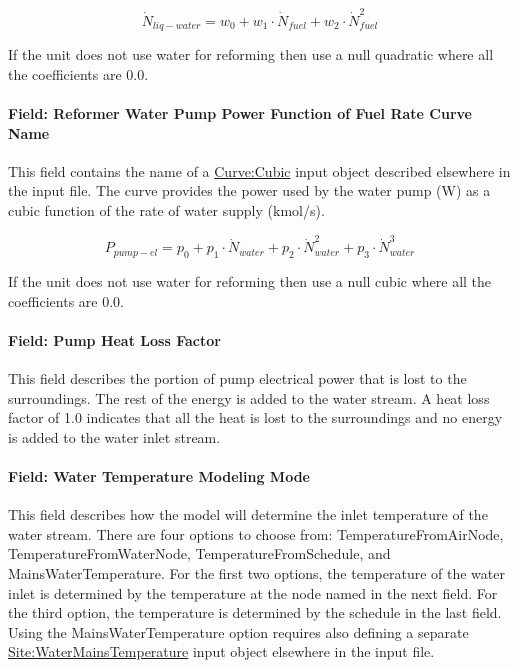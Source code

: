 \begin{equation}
{\dot N_{liq - water}} = {w_0} + {w_1} \cdot {\dot N_{fuel}} + {w_2} \cdot \dot N_{fuel}^2
\end{equation}

If the unit does not use water for reforming then use a null quadratic where all the coefficients are 0.0.

\paragraph{Field: Reformer Water Pump Power Function of Fuel Rate Curve Name}\label{field-reformer-water-pump-power-function-of-fuel-rate-curve-name}

This field contains the name of a \hyperref[curvecubic]{Curve:Cubic} input object described elsewhere in the input file. The curve provides the power used by the water pump (W) as a cubic function of the rate of water supply (kmol/s).

\begin{equation}
{P_{pump - el}} = {p_0} + {p_1} \cdot {\dot N_{water}} + {p_2} \cdot \dot N_{water}^2 + {p_3} \cdot \dot N_{water}^3
\end{equation}

If the unit does not use water for reforming then use a null cubic where all the coefficients are 0.0.

\paragraph{Field: Pump Heat Loss Factor}\label{field-pump-heat-loss-factor}

This field describes the portion of pump electrical power that is lost to the surroundings. The rest of the energy is added to the water stream. A heat loss factor of 1.0 indicates that all the heat is lost to the surroundings and no energy is added to the water inlet stream.

\paragraph{Field: Water Temperature Modeling Mode}\label{field-water-temperature-modeling-mode}

This field describes how the model will determine the inlet temperature of the water stream. There are four options to choose from: TemperatureFromAirNode, TemperatureFromWaterNode, TemperatureFromSchedule, and MainsWaterTemperature. For the first two options, the temperature of the water inlet is determined by the temperature at the node named in the next field. For the third option, the temperature is determined by the schedule in the last field. Using the MainsWaterTemperature option requires also defining a separate \hyperref[sitewatermainstemperature]{Site:WaterMainsTemperature} input object elsewhere in the input file.

